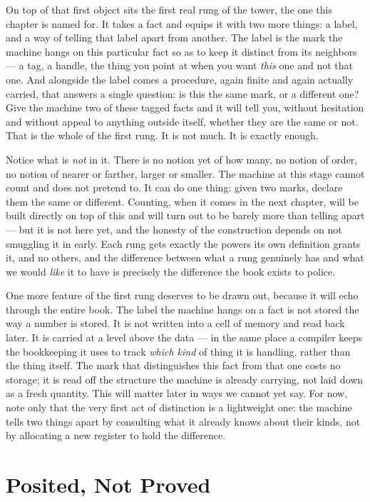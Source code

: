 On top of that first object sits the first real rung of the tower, the one this chapter is named for. It takes a
fact and equips it with two more things: a label, and a way of telling that label apart from another. The label
is the mark the machine hangs on this particular fact so as to keep it distinct from its neighbors --- a tag, a
handle, the thing you point at when you want \emph{this} one and not that one. And alongside the label comes a
procedure, again finite and again actually carried, that answers a single question: is this the same mark, or a
different one? Give the machine two of these tagged facts and it will tell you, without hesitation and without
appeal to anything outside itself, whether they are the same or not. That is the whole of the first rung. It is
not much. It is exactly enough.

Notice what is \emph{not} in it. There is no notion yet of how many, no notion of order, no notion of nearer or
farther, larger or smaller. The machine at this stage cannot count and does not pretend to. It can do one thing:
given two marks, declare them the same or different. Counting, when it comes in the next chapter, will be built
directly on top of this and will turn out to be barely more than telling apart --- but it is not here yet, and
the honesty of the construction depends on not smuggling it in early. Each rung gets exactly the powers its own
definition grants it, and no others, and the difference between what a rung genuinely has and what we would
\emph{like} it to have is precisely the difference the book exists to police.

One more feature of the first rung deserves to be drawn out, because it will echo through the entire book. The
label the machine hangs on a fact is not stored the way a number is stored. It is not written into a cell of
memory and read back later. It is carried at a level above the data --- in the same place a compiler keeps the
bookkeeping it uses to track \emph{which kind} of thing it is handling, rather than the thing itself. The mark
that distinguishes this fact from that one costs no storage; it is read off the structure the machine is already
carrying, not laid down as a fresh quantity. This will matter later in ways we cannot yet say. For now, note only
that the very first act of distinction is a lightweight one: the machine tells two things apart by consulting
what it already knows about their kinds, not by allocating a new register to hold the difference.

\section{Posited, Not Proved}


